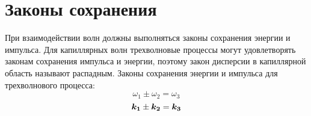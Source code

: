 




\section{Законы сохранения} %

При взаимодействии волн должны выполняться законы сохранения энергии и импульса. Для капиллярных волн трехволновые процессы могут удовлетворять законам сохранения импульса и энергии, поэтому закон дисперсии в капиллярной область называют распадным. Законы сохранения энергии и импульса для трехволнового процесса:
\begin{equation}
 \label{eq:saveOmega}
\omega_1 \pm \omega_2 = \omega_3
\end{equation}
\begin{equation}
 \label{eq:saveK}
\mbox{\boldmath$k_1$} \pm \mbox{\boldmath$k_2$} = \mbox{\boldmath$k_3$}
\end{equation}

